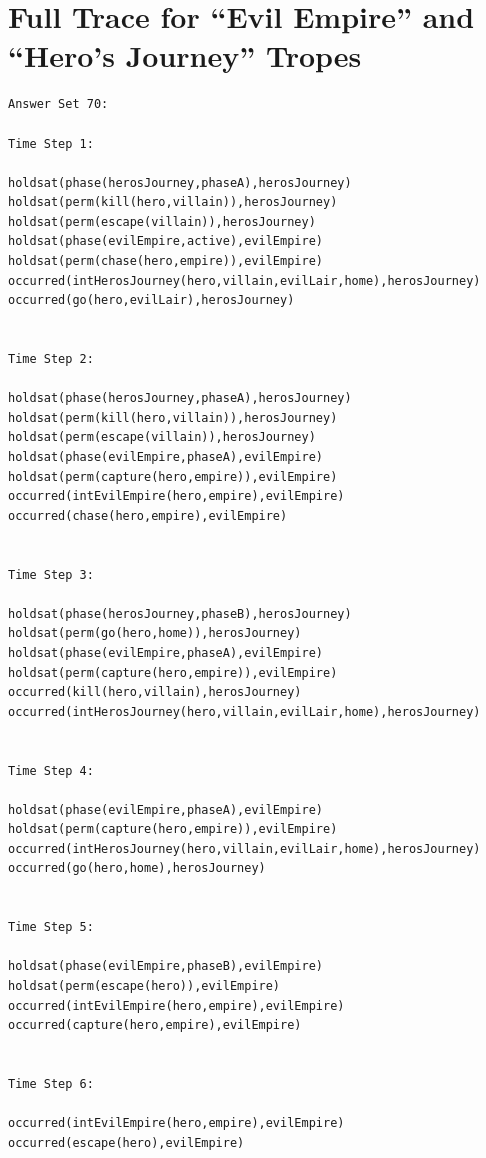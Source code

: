 \documentclass[11pt]{report}
\begin{document}
\chapter{Full Trace for ``Evil Empire'' and ``Hero's Journey'' Tropes}
\label{appendix:full-trace}

\begin{lstlisting}[label={lst:hero-evil-trace},caption={Example trace for both the ``Evil Empire'' and
``Hero's Journey'' tropes combined together}]
Answer Set 70:

Time Step 1:

holdsat(phase(herosJourney,phaseA),herosJourney)
holdsat(perm(kill(hero,villain)),herosJourney)
holdsat(perm(escape(villain)),herosJourney)
holdsat(phase(evilEmpire,active),evilEmpire)
holdsat(perm(chase(hero,empire)),evilEmpire)
occurred(intHerosJourney(hero,villain,evilLair,home),herosJourney)
occurred(go(hero,evilLair),herosJourney)


Time Step 2:

holdsat(phase(herosJourney,phaseA),herosJourney)
holdsat(perm(kill(hero,villain)),herosJourney)
holdsat(perm(escape(villain)),herosJourney)
holdsat(phase(evilEmpire,phaseA),evilEmpire)
holdsat(perm(capture(hero,empire)),evilEmpire)
occurred(intEvilEmpire(hero,empire),evilEmpire)
occurred(chase(hero,empire),evilEmpire)


Time Step 3:

holdsat(phase(herosJourney,phaseB),herosJourney)
holdsat(perm(go(hero,home)),herosJourney)
holdsat(phase(evilEmpire,phaseA),evilEmpire)
holdsat(perm(capture(hero,empire)),evilEmpire)
occurred(kill(hero,villain),herosJourney)
occurred(intHerosJourney(hero,villain,evilLair,home),herosJourney)


Time Step 4:

holdsat(phase(evilEmpire,phaseA),evilEmpire)
holdsat(perm(capture(hero,empire)),evilEmpire)
occurred(intHerosJourney(hero,villain,evilLair,home),herosJourney)
occurred(go(hero,home),herosJourney)


Time Step 5:

holdsat(phase(evilEmpire,phaseB),evilEmpire)
holdsat(perm(escape(hero)),evilEmpire)
occurred(intEvilEmpire(hero,empire),evilEmpire)
occurred(capture(hero,empire),evilEmpire)


Time Step 6:

occurred(intEvilEmpire(hero,empire),evilEmpire)
occurred(escape(hero),evilEmpire)
\end{lstlisting}
\end{document}

